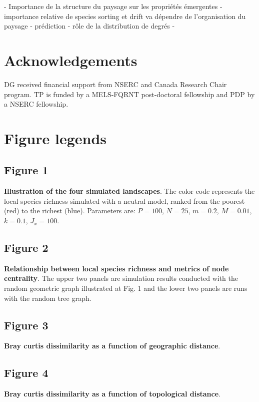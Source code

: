 \documentclass[12pt]{article}
\begin{document}
- Importance de la structure du paysage sur les propriétés émergentes
	- importance relative de species sorting et drift va dépendre de l'organisation du paysage
	- prédiction
	- rôle de la distribution de degrés
- 

\section{Acknowledgements}
DG received financial support from NSERC and Canada Research Chair program. TP
is funded by a MELS-FQRNT post-doctoral fellowship and PDP by a NSERC
fellowship.
\newpage

\printbibliography

\newpage
\section*{Figure legends}

\subsection*{Figure 1}
\textbf{Illustration of the four simulated landscapes}. The color code
represents the local species richness simulated with a neutral model, ranked
from the poorest (red) to the richest (blue). Parameters are: $P = 100$, $N =
25$, $m = 0.2$, $M = 0.01$, $k = 0.1$, $J_x = 100$.

\subsection*{Figure 2}
\textbf{Relationship between local species richness and metrics of node
centrality}. The upper two panels are simulation results conducted with the
random geometric graph illustrated at Fig. 1 and the lower two panels are runs
with the random tree graph. 

\subsection*{Figure 3}
\textbf{Bray curtis dissimilarity as a function of geographic distance}. 

\subsection*{Figure 4}
\textbf{Bray curtis dissimilarity as a function of topological distance}. 
\end{document}
